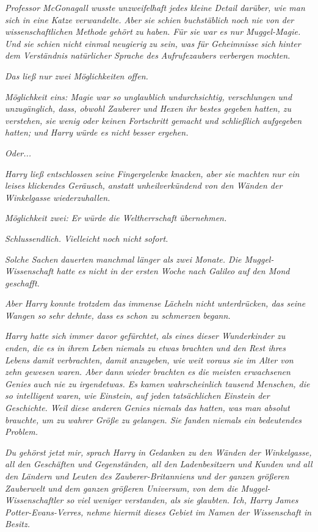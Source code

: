 {\emph{Professor McGonagall wusste unzweifelhaft jedes kleine Detail darüber, wie man sich in eine Katze verwandelte. Aber sie schien buchstäblich noch nie von der wissenschaftlichen Methode} \emph{\emph{gehört}} \emph{zu haben. Für sie war es nur Muggel-Magie. Und sie schien nicht einmal} \emph{\emph{neugierig}} \emph{zu sein, was für Geheimnisse sich hinter dem Verständnis natürlicher Sprache des Aufrufezaubers verbergen mochten.}

\emph{Das ließ nur zwei Möglichkeiten offen.}

\emph{Möglichkeit eins: Magie war so unglaublich undurchsichtig, verschlungen und unzugänglich, dass, obwohl Zauberer und Hexen ihr bestes gegeben hatten, zu verstehen, sie wenig oder keinen Fortschritt gemacht und schließlich aufgegeben hatten; und Harry würde es nicht besser ergehen.}

\emph{\emph{Oder...}}

\emph{Harry ließ entschlossen seine Fingergelenke knacken, aber sie machten nur ein leises klickendes Geräusch, anstatt unheilverkündend von den Wänden der Winkelgasse wiederzuhallen.}

\emph{Möglichkeit zwei: Er würde die Weltherrschaft übernehmen.}

\emph{Schlussendlich. Vielleicht noch nicht sofort.}

\emph{Solche Sachen} \emph{\emph{dauerten}} \emph{manchmal länger als zwei Monate. Die Muggel-Wissenschaft hatte es nicht in der ersten Woche nach Galileo auf den Mond geschafft.}

\emph{Aber Harry konnte trotzdem das immense Lächeln nicht unterdrücken, das seine Wangen so sehr dehnte, dass es schon zu schmerzen begann.}

\emph{Harry hatte sich immer davor gefürchtet, als eines dieser Wunderkinder zu enden, die es in ihrem Leben niemals zu etwas brachten und den Rest ihres Lebens damit verbrachten, damit anzugeben, wie weit voraus sie im Alter von zehn gewesen waren. Aber dann wieder brachten es die meisten erwachsenen Genies auch nie zu irgendetwas. Es kamen wahrscheinlich tausend Menschen, die so intelligent waren, wie Einstein, auf jeden tatsächlichen Einstein der Geschichte. Weil diese anderen Genies niemals das hatten, was man absolut brauchte, um zu wahrer Größe zu gelangen. Sie fanden niemals ein bedeutendes Problem.}

\emph{\emph{Du gehörst jetzt mir,}} \emph{sprach Harry in Gedanken zu den Wänden der Winkelgasse, all den Geschäften und Gegenständen, all den Ladenbesitzern und Kunden und all den Ländern und Leuten des Zauberer-Britanniens und der ganzen größeren Zauberwelt und dem ganzen größeren Universum, von dem die Muggel-Wissenschaftler so viel weniger verstanden, als sie glaubten.} \emph{\emph{Ich, Harry James Potter-Evans-Verres, nehme hiermit dieses Gebiet im Namen der Wissenschaft in Besitz.}}

}
